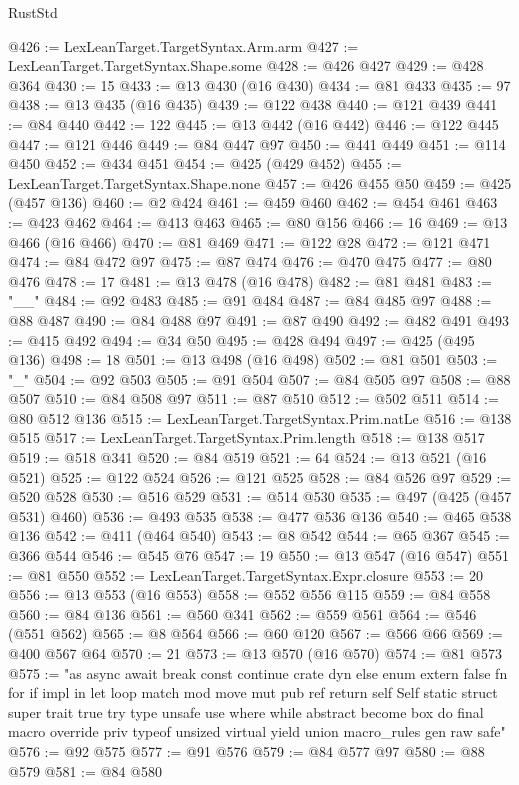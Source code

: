 \begin{lexlean}{RustStd}
\begin{coremodule}
{\begin{coremodule}
{{{{{{{{{{{{{{{{{{{{{{{{{{{{{{{{{{{{{{{{{{{{{{{{{{{{{@426 := LexLeanTarget.TargetSyntax.Arm.arm
@427 := LexLeanTarget.TargetSyntax.Shape.some
@428 := @426 @427
@429 := @428 @364
@430 := 15
@433 := @13 @430 (@16 @430)
@434 := @81 @433
@435 := 97
@438 := @13 @435 (@16 @435)
@439 := @122 @438
@440 := @121 @439
@441 := @84 @440
@442 := 122
@445 := @13 @442 (@16 @442)
@446 := @122 @445
@447 := @121 @446
@449 := @84 @447 @97
@450 := @441 @449
@451 := @114 @450
@452 := @434 @451
@454 := @425 (@429 @452)
@455 := LexLeanTarget.TargetSyntax.Shape.none
@457 := @426 @455 @50
@459 := @425 (@457 @136)
@460 := @2 @424
@461 := @459 @460
@462 := @454 @461
@463 := @423 @462
@464 := @413 @463
@465 := @80 @156
@466 := 16
@469 := @13 @466 (@16 @466)
@470 := @81 @469
@471 := @122 @28
@472 := @121 @471
@474 := @84 @472 @97
@475 := @87 @474
@476 := @470 @475
@477 := @80 @476
@478 := 17
@481 := @13 @478 (@16 @478)
@482 := @81 @481
@483 := "__"
@484 := @92 @483
@485 := @91 @484
@487 := @84 @485 @97
@488 := @88 @487
@490 := @84 @488 @97
@491 := @87 @490
@492 := @482 @491
@493 := @415 @492
@494 := @34 @50
@495 := @428 @494
@497 := @425 (@495 @136)
@498 := 18
@501 := @13 @498 (@16 @498)
@502 := @81 @501
@503 := "_"
@504 := @92 @503
@505 := @91 @504
@507 := @84 @505 @97
@508 := @88 @507
@510 := @84 @508 @97
@511 := @87 @510
@512 := @502 @511
@514 := @80 @512 @136
@515 := LexLeanTarget.TargetSyntax.Prim.natLe
@516 := @138 @515
@517 := LexLeanTarget.TargetSyntax.Prim.length
@518 := @138 @517
@519 := @518 @341
@520 := @84 @519
@521 := 64
@524 := @13 @521 (@16 @521)
@525 := @122 @524
@526 := @121 @525
@528 := @84 @526 @97
@529 := @520 @528
@530 := @516 @529
@531 := @514 @530
@535 := @497 (@425 (@457 @531) @460)
@536 := @493 @535
@538 := @477 @536 @136
@540 := @465 @538 @136
@542 := @411 (@464 @540)
@543 := @8 @542
@544 := @65 @367
@545 := @366 @544
@546 := @545 @76
@547 := 19
@550 := @13 @547 (@16 @547)
@551 := @81 @550
@552 := LexLeanTarget.TargetSyntax.Expr.closure
@553 := 20
@556 := @13 @553 (@16 @553)
@558 := @552 @556 @115
@559 := @84 @558
@560 := @84 @136
@561 := @560 @341
@562 := @559 @561
@564 := @546 (@551 @562)
@565 := @8 @564
@566 := @60 @120
@567 := @566 @66
@569 := @400 @567 @64
@570 := 21
@573 := @13 @570 (@16 @570)
@574 := @81 @573
@575 := "as async await break const continue crate dyn else enum extern false fn for if impl in let loop match mod move mut pub ref return self Self static struct super trait true try type unsafe use where while abstract become box do final macro override priv typeof unsized virtual yield union macro_rules gen raw safe"
@576 := @92 @575
@577 := @91 @576
@579 := @84 @577 @97
@580 := @88 @579
@581 := @84 @580
}}}}}}}}}}}}}}}}}}}}}}}}}}}}}}}}}}}}}}}}}}}}}}}}}}}}}
\end{coremodule}}
\end{coremodule}
\end{lexlean}
